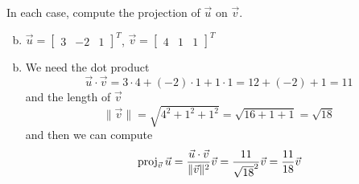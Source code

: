 \documentclass[../main.tex]{subfiles}
\begin{document}
In each case, compute the projection of $\vec{u}$ on $\vec{v}$.
\begin{enumerate}[a)]
	\setcounter{enumi}{1}
	\item 
		$\vec{u} = \begin{bmatrix}3&-2&1\end{bmatrix}^T$,
		$\vec{v} = \begin{bmatrix}4&1&1\end{bmatrix}^T$
\end{enumerate}

\solution
\begin{enumerate}[a)]
	\setcounter{enumi}{1}
	\item We need the dot product
		\[
			\vec{u}\cdot\vec{v}
			=
			3\cdot4 + (-2)\cdot1 + 1\cdot1
			=
			12 + (-2) + 1
			=
			11
		\]
		and the length of $\vec{v}$
		\[
			\|\vec{v}\|
			=
			\sqrt{4^2 + 1^2 + 1^2}
			=
			\sqrt{16 + 1 + 1}
			=
			\sqrt{18}
		\]
		and then we can compute
		\[
			\operatorname{proj}_{\vec{v}}\vec{u}
			=
			\frac{\vec{u}\cdot\vec{v}}{\|\vec{v}\|^2}\vec{v}
			=
			\frac{11}{\sqrt{18}^2}\vec{v}
			=
			\frac{11}{18}\vec{v}
		\]
\end{enumerate}
\end{document}
